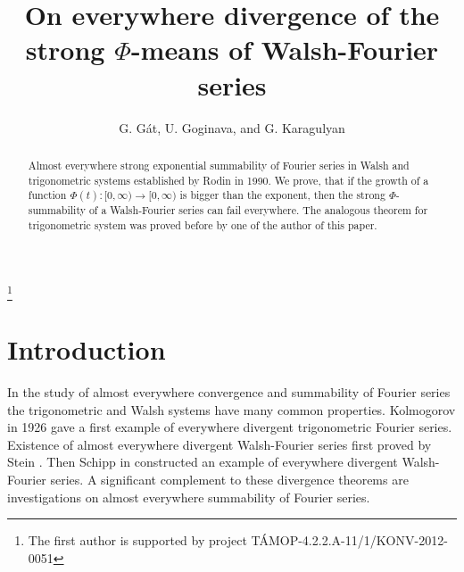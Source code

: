 \documentclass{amsart}
\numberwithin{equation}{section}
\begin{document}
\author{G. G\'at, U. Goginava,  and G. Karagulyan}

\title{On everywhere divergence of the strong $\Phi$-means of Walsh-Fourier series}
\address{G. G\'at, Institute of Mathematics and Computer Science, College of
Ny\'\i regyh\'aza, P.O. Box 166, Nyiregyh\'aza, H-4400 Hungary}
\address{U. Goginava, Department of Mathematics, Faculty of Exact and
Natural Sciences, Tbilisi State University, Chavchavadze str. 1, Tbilisi
0128, Georgia}

\address{G. Karagulyan, Institute of Mathematics of Armenian National Academy
of Science, Bughramian Ave. 24b, 375019, Yerevan, Armenia}
\thanks{The first author is supported by project T\'AMOP-4.2.2.A-11/1/KONV-2012-0051}

\begin{abstract}
Almost everywhere strong  exponential summability of Fourier series in Walsh and trigonometric systems established by Rodin in 1990. We prove, that if the growth of a function $\Phi(t):[0,\infty)\to[0,\infty)$ is bigger than the exponent, then the strong $\Phi$-summability of a Walsh-Fourier series can fail everywhere. The analogous theorem for trigonometric system was proved before by one of the author of this paper.
\end{abstract}
\maketitle
\section{Introduction}
In the study of almost everywhere convergence and summability  of Fourier series the trigonometric and Walsh systems have many common properties. Kolmogorov \cite{Kol} in 1926 gave a first example of everywhere divergent trigonometric Fourier series. Existence of almost everywhere divergent Walsh-Fourier series first proved by Stein \cite{Ste}. Then Schipp in \cite{Sch1} constructed an example of everywhere divergent Walsh-Fourier series. A significant complement to these divergence theorems are investigations on almost everywhere summability of Fourier series.
\end{document}

